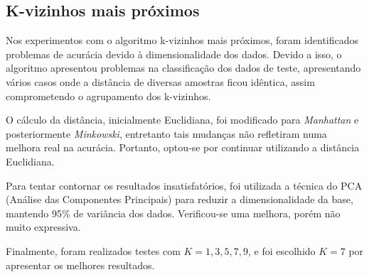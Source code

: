 \subsection{K-vizinhos mais próximos}
 
Nos experimentos com o algoritmo k-vizinhos mais próximos, foram identificados problemas de acurácia devido à dimensionalidade dos dados. Devido a isso, o algoritmo apresentou problemas na classificação dos dados de teste, apresentando vários casos onde a distância de diversas amostras ficou idêntica, assim comprometendo o agrupamento dos k-vizinhos. 

O cálculo da distância, inicialmente Euclidiana, foi modificado para \emph{Manhattan} e posteriormente \emph{Minkowski}, entretanto tais mudanças não refletiram numa melhora real na acurácia. Portanto, optou-se por continuar utilizando a distância Euclidiana.

Para tentar contornar os resultados insatisfatórios, foi utilizada a técnica do PCA (Análise das Componentes Principais) para reduzir a dimensionalidade da base, mantendo 95\% de variância dos dados. Verificou-se uma melhora, porém não muito expressiva.

Finalmente, foram realizados testes com $K = 1, 3, 5, 7, 9$, e foi escolhido $K=7$ por apresentar os melhores resultados.
